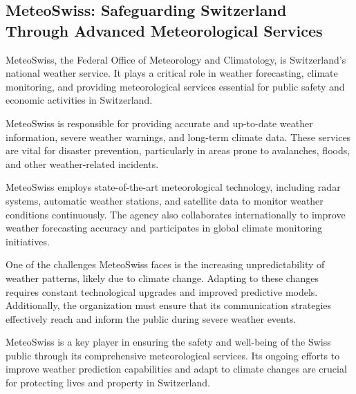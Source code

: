 \subsection{MeteoSwiss: Safeguarding Switzerland Through Advanced Meteorological Services}

MeteoSwiss, the Federal Office of Meteorology and Climatology, is Switzerland's
national weather service. It plays a critical role in weather forecasting,
climate monitoring, and providing meteorological services essential for public
safety and economic activities in Switzerland.

MeteoSwiss is responsible for providing accurate and up-to-date weather
information, severe weather warnings, and long-term climate data. These services
are vital for disaster prevention, particularly in areas prone to avalanches,
floods, and other weather-related incidents. 

MeteoSwiss employs state-of-the-art meteorological technology, including radar
systems, automatic weather stations, and satellite data to monitor weather
conditions continuously. The agency also collaborates internationally to improve
weather forecasting accuracy and participates in global climate monitoring
initiatives.

One of the challenges MeteoSwiss faces is the increasing unpredictability of
weather patterns, likely due to climate change. Adapting to these changes
requires constant technological upgrades and improved predictive models.
Additionally, the organization must ensure that its communication strategies
effectively reach and inform the public during severe weather events.

MeteoSwiss is a key player in ensuring the safety and well-being of the Swiss
public through its comprehensive meteorological services. Its ongoing efforts to
improve weather prediction capabilities and adapt to climate changes are crucial
for protecting lives and property in Switzerland.

